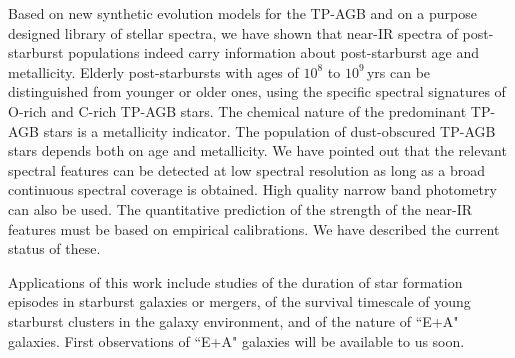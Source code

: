 \documentclass[runningheads]{svmult}
\begin{document}
Based on new synthetic evolution models for the TP-AGB and on a 
purpose designed library of stellar spectra, we have shown that
near-IR spectra of post-starburst populations indeed carry 
information about post-starburst age and metallicity. Elderly
post-starbursts with ages of $10^8$ to $10^9$\,yrs can 
be distinguished from younger or older ones, using the specific
spectral signatures of O-rich and C-rich TP-AGB stars. The
chemical nature of the predominant TP-AGB stars is a metallicity
indicator. The population of dust-obscured TP-AGB stars depends
both on age and metallicity. We have pointed out
that the relevant spectral features can be detected at low spectral 
resolution as long as 
a broad continuous spectral coverage is obtained. High quality narrow 
band photometry can also be used. The quantitative
prediction of the strength of the near-IR features must be
based on empirical calibrations. We have described the current 
status of these.

Applications of this work include studies of the duration of 
star formation episodes in starburst galaxies or mergers, of
the survival timescale of young starburst clusters in the
galaxy environment, and of the nature of ``E+A" galaxies.
First observations of ``E+A" galaxies will be available to us soon.
 
\end{document}
